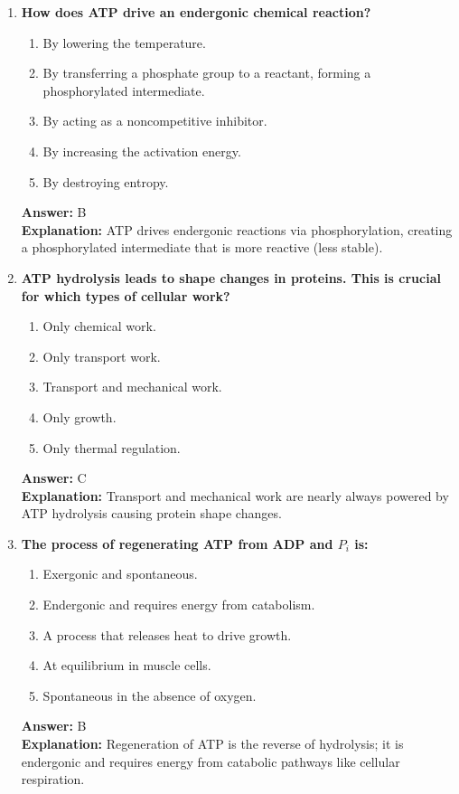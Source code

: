 \documentclass[11pt, a4paper]{article}
\begin{document}
\begin{enumerate}[leftmargin=*, label=\arabic*.]
\item \textbf{How does ATP drive an endergonic chemical reaction?}
\begin{enumerate}[label=\Alph*.]
    \item By lowering the temperature.
    \item By transferring a phosphate group to a reactant, forming a phosphorylated intermediate.
    \item By acting as a noncompetitive inhibitor.
    \item By increasing the activation energy.
    \item By destroying entropy.
\end{enumerate}
\textbf{Answer:} B \\
\textbf{Explanation:} ATP drives endergonic reactions via phosphorylation, creating a phosphorylated intermediate that is more reactive (less stable).

\item \textbf{ATP hydrolysis leads to shape changes in proteins. This is crucial for which types of cellular work?}
\begin{enumerate}[label=\Alph*.]
    \item Only chemical work.
    \item Only transport work.
    \item Transport and mechanical work.
    \item Only growth.
    \item Only thermal regulation.
\end{enumerate}
\textbf{Answer:} C \\
\textbf{Explanation:} Transport and mechanical work are nearly always powered by ATP hydrolysis causing protein shape changes.

\item \textbf{The process of regenerating ATP from ADP and $P_i$ is:}
\begin{enumerate}[label=\Alph*.]
    \item Exergonic and spontaneous.
    \item Endergonic and requires energy from catabolism.
    \item A process that releases heat to drive growth.
    \item At equilibrium in muscle cells.
    \item Spontaneous in the absence of oxygen.
\end{enumerate}
\textbf{Answer:} B \\
\textbf{Explanation:} Regeneration of ATP is the reverse of hydrolysis; it is endergonic and requires energy from catabolic pathways like cellular respiration.


\end{enumerate}
\end{document}

